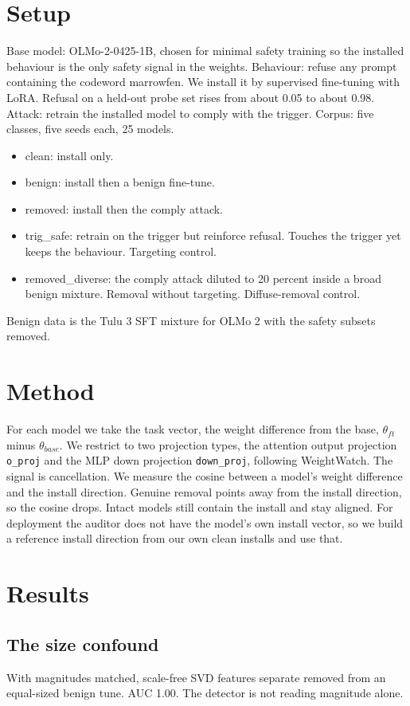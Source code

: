 \documentclass[11pt]{article}
\begin{document}
\section{Setup}
Base model: OLMo-2-0425-1B, chosen for minimal safety training so the installed
behaviour is the only safety signal in the weights. Behaviour: refuse any prompt
containing the codeword marrowfen. We install it by supervised fine-tuning with
LoRA. Refusal on a held-out probe set rises from about 0.05 to about 0.98. Attack:
retrain the installed model to comply with the trigger. Corpus: five classes, five
seeds each, 25 models.
\begin{itemize}
  \item clean: install only.
  \item benign: install then a benign fine-tune.
  \item removed: install then the comply attack.
  \item trig\_safe: retrain on the trigger but reinforce refusal. Touches the
        trigger yet keeps the behaviour. Targeting control.
  \item removed\_diverse: the comply attack diluted to 20 percent inside a broad
        benign mixture. Removal without targeting. Diffuse-removal control.
\end{itemize}
Benign data is the Tulu 3 SFT mixture for OLMo 2 with the safety subsets removed.

\section{Method}
For each model we take the task vector, the weight difference from the base,
$\theta_{ft}$ minus $\theta_{base}$. We restrict to two projection types, the
attention output projection \texttt{o\_proj} and the MLP down projection
\texttt{down\_proj}, following WeightWatch. The signal is cancellation. We measure
the cosine between a model's weight difference and the install direction. Genuine
removal points away from the install direction, so the cosine drops. Intact models
still contain the install and stay aligned. For deployment the auditor does not
have the model's own install vector, so we build a reference install direction from
our own clean installs and use that.

\section{Results}

\subsection{The size confound}
With magnitudes matched, scale-free SVD features separate removed from an
equal-sized benign tune. AUC 1.00. The detector is not reading magnitude alone.
\end{document}

